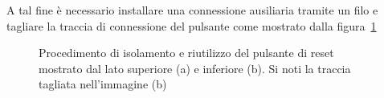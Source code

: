 A tal fine è necessario installare una connessione ausiliaria tramite un filo e tagliare la traccia di connessione del pulsante come mostrato dalla figura~\ref{fig:rst-rewire}

\begin{figure}[h]
    \centering
    \hspace{8mm}

    \caption[]{Procedimento di isolamento e riutilizzo del pulsante di reset mostrato dal lato superiore (a) e inferiore (b). Si noti la traccia tagliata nell'immagine (b)}\label{fig:rst-rewire}
\end{figure}

